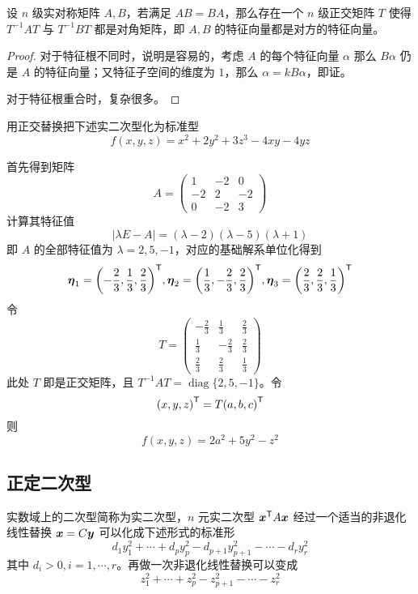 \begin{theorem}
	设 $n$ 级实对称矩阵 $A,B$，若满足 $AB=BA$，那么存在一个 $n$ 级正交矩阵 $T$ 使得 $T^{-1}AT$ 与 $T^{-1}BT$ 都是对角矩阵，即 $A,B$ 的特征向量都是对方的特征向量。
\end{theorem}

\begin{proof}
	对于特征根不同时，说明是容易的，考虑 $A$ 的每个特征向量 $\alpha$ 那么 $B\alpha$ 仍是 $A$ 的特征向量；又特征子空间的维度为 $1$，那么 $\alpha = k B \alpha$，即证。

	对于特征根重合时，复杂很多。
\end{proof}

\begin{example}
	用正交替换把下述实二次型化为标准型
	\[ f(x, y, z) = x^2 + 2y^2 + 3z^3 - 4xy - 4yz \]
\end{example}

\begin{solution}
	首先得到矩阵
	\[ A = \left(\begin{matrix}
				1 & -2 & 0 \\ -2 & 2 & -2 \\ 0 & -2 & 3
			\end{matrix}\right) \]
	计算其特征值
	\[ |\lambda E -A| = (\lambda - 2)(\lambda - 5)(\lambda + 1) \]
	即 $A$ 的全部特征值为 $\lambda = 2, 5, -1$，对应的基础解系单位化得到
	\[ \boldsymbol{\eta}_1 = {\left(-\frac{2}{3}, \frac{1}{3}, \frac{2}{3}\right)}^\mathsf{T}, \boldsymbol{\eta}_2 = {\left(\frac{1}{3}, -\frac{2}{3}, \frac{2}{3}\right)}^\mathsf{T}, \boldsymbol{\eta}_3 = {\left(\frac{2}{3}, \frac{2}{3}, \frac{1}{3}\right)}^\mathsf{T}  \]
	令
	\[ T = \left(\begin{matrix}
				-\frac{2}{3} & \frac{1}{3}  & \frac{2}{3} \\
				\frac{1}{3}  & -\frac{2}{3} & \frac{2}{3} \\
				\frac{2}{3}  & \frac{2}{3}  & \frac{1}{3}
			\end{matrix}\right) \]
	此处 $T$ 即是正交矩阵，且 $T^{-1}AT = \operatorname{diag}\{2, 5, -1\}$。令
	\[ {\left(x, y, z\right)}^\mathsf{T} = T {\left(a, b, c\right)}^\mathsf{T} \]
	则
	\[ f(x, y, z) = 2a^2 + 5y^2 - z^2 \]
\end{solution}

\subsection{正定二次型}

实数域上的二次型简称为实二次型，$n$ 元实二次型 ${\boldsymbol{x}}^\mathsf{T}A\boldsymbol{x}$ 经过一个适当的非退化线性替换 $\boldsymbol{x} = C\boldsymbol{y}$ 可以化成下述形式的标准形
\[ d_1y_1^2+\cdots+d_py_p^2-d_{p+1}y_{p+1}^2-\cdots-d_ry_r^2 \]
其中 $d_i>0,i=1,\cdots,r$。再做一次非退化线性替换可以变成
\[ z_1^2+\cdots+z_p^2-z_{p+1}^2-\cdots-z_r^2 \]

